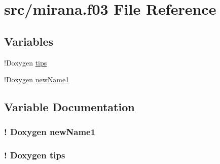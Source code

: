 \hypertarget{mirana_8f03}{\section{src/mirana.f03 File Reference}
\label{mirana_8f03}
}
\subsection*{Variables}
\begin{DoxyCompactItemize}
\item 
!Doxygen \hyperlink{mirana_8f03_a30bb699f8329a1570c8658779930f0f2}{tips}
\item 
!Doxygen \hyperlink{mirana_8f03_ad1e5f157e1b3b94b78ce3135a47d256d}{new\-Name1}
\end{DoxyCompactItemize}


\subsection{Variable Documentation}
\hypertarget{mirana_8f03_ad1e5f157e1b3b94b78ce3135a47d256d}{
\subsubsection[{new\-Name1}]{\setlength{\rightskip}{0pt plus 5cm}! Doxygen new\-Name1}}\label{mirana_8f03_ad1e5f157e1b3b94b78ce3135a47d256d}
\hypertarget{mirana_8f03_a30bb699f8329a1570c8658779930f0f2}{
\subsubsection[{tips}]{\setlength{\rightskip}{0pt plus 5cm}! Doxygen tips}}\label{mirana_8f03_a30bb699f8329a1570c8658779930f0f2}
